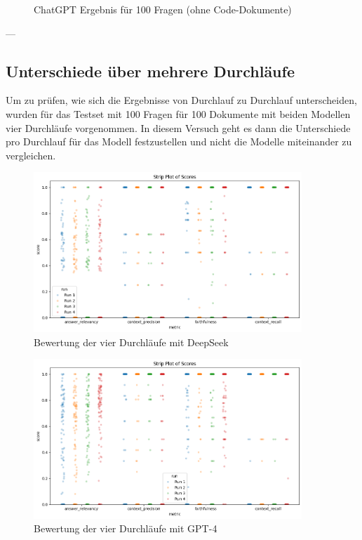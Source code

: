 \begin{figure}[htbp]
\begin{minipage}[b]{0.48\textwidth}
        \caption{ChatGPT Ergebnis für 100 Fragen (ohne Code-Dokumente)}
        \label{fig:chatgpt_no_code}
    \end{minipage}
\end{figure}

---

\subsection{Unterschiede über mehrere Durchläufe}

Um zu prüfen, wie sich die Ergebnisse von Durchlauf zu Durchlauf unterscheiden, wurden für das Testset mit 100 Fragen für 100 Dokumente mit beiden Modellen vier Durchläufe vorgenommen.
In diesem Versuch geht es dann die Unterschiede pro Durchlauf für das Modell festzustellen und nicht die Modelle miteinander zu vergleichen.

\begin{figure}[h!]
    \centering
    \includegraphics[width=0.9\textwidth]{images/strip_plot_100_100_D_D.png}
    \caption{Bewertung der vier Durchläufe mit DeepSeek}
    \label{fig:strip_plot_deepseek}
\end{figure}

\begin{figure}[h!]
    \centering
    \includegraphics[width=0.9\textwidth]{images/strip_plot_100_100_O_O.png}
    \caption{Bewertung der vier Durchläufe mit GPT-4}
    \label{fig:strip_plot_gpt4}
\end{figure}

